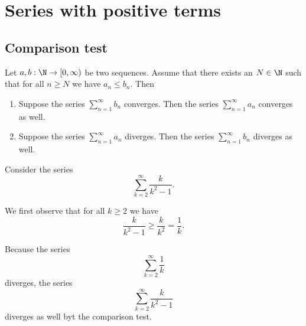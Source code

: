 \section{Series with positive terms}

\subsection{Comparison test}
\begin{theorem}
    Let $a,b: \N \to [0, \infty)$ be two sequences. Assume that there exists an $N \in \N$ such that for all $n \ge N$ we have $a_n \le b_n$. Then
    \begin{enumerate}
        \item Suppose the series $\sum_{n=1}^\infty b_n$ converges. Then the series $\sum_{n=1}^\infty a_n$ converges as well.
        \item Suppose the series $\sum_{n=1}^\infty a_n$ diverges. Then the series $\sum_{n=1}^\infty b_n$ diverges as well.
    \end{enumerate}
\end{theorem}
\begin{example}
    Consider the series
    $$\sum_{k=2}^{\infty}\frac{k}{k^2-1}.$$

    We first observe that for all $k \ge 2$ we have
    $$\frac{k}{k^2-1} \ge \frac{k}{k^2} = \frac{1}{k}.$$

    Because the series
    $$\sum_{k=2}^{\infty}\frac{1}{k}$$
    diverges, the series
    $$\sum_{k=2}^{\infty}\frac{k}{k^2-1}$$
    diverges as well byt the comparison test.
\end{example}

